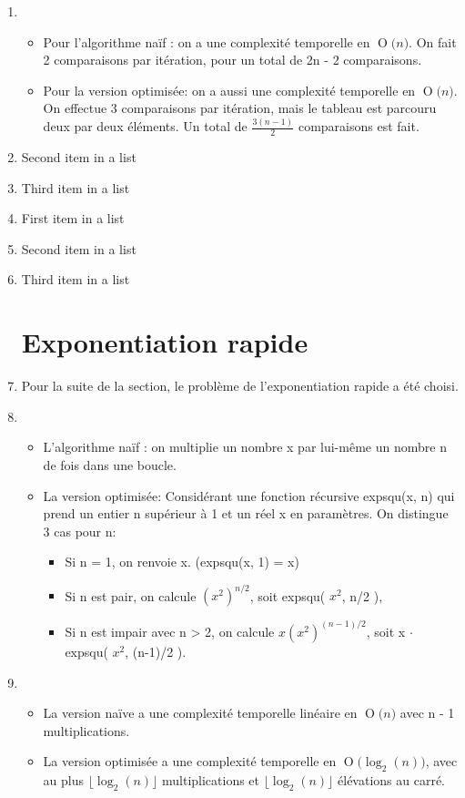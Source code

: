 \documentclass[paper=a4, fontsize=11pt]{scrartcl}
\numberwithin{equation}{section}		%
\numberwithin{figure}{section}			%
\numberwithin{table}{section}				%
\newcommand{\BigO}[1]{\ensuremath{\operatorname{O}\bigl(#1\bigr)}}
\begin{document}
\begin{enumerate}
   	\item
\begin{itemize}
    \item Pour l'algorithme naïf : on a une complexité temporelle en \BigO{n}. On fait 2 comparaisons par itération, pour un total
de 2n - 2 comparaisons.
    \item Pour la version optimisée: on a aussi une complexité temporelle en \BigO{n}. On effectue 3 comparaisons par itération, mais le tableau
est parcouru deux par deux éléments. Un total de \(\frac{3(n - 1)}{2}\) comparaisons est fait.
\end{itemize}

	\item Second item in a list
	\item Third item in a list
    \item First item in a list
	\item Second item in a list
	\item Third item in a list

\section{Exponentiation rapide}

	\item Pour la suite de la section, le problème de l'exponentiation rapide a été choisi.

   	\item

\begin{itemize}
    \item L'algorithme naïf : on multiplie un nombre x par lui-même un nombre n de fois dans une boucle.
    \item La version optimisée: Considérant une fonction récursive expsqu(x, n) qui prend un entier n supérieur à 1 et un réel
x en paramètres. On distingue 3 cas pour n:
\begin{itemize}[label=$\bullet$]
\item Si n = 1, on renvoie x. (expsqu(x, 1) = x)
\item Si n est pair, on calcule \( (x^2)^{n/2} \), soit expsqu( \(x^2\), n/2 ),
\item Si n est impair avec n > 2, on calcule \( x(x^2)^{(n-1)/2} \), soit x $\cdot$ expsqu( \( x^2 \), (n-1)/2 ).
\end{itemize}
\end{itemize}

	\item
\begin{itemize}
    \item La version naïve a une complexité temporelle linéaire en \BigO{n} avec n - 1 multiplications.
    \item
 La version optimisée a une complexité temporelle en \BigO{\log _2 \left( n \right )}, avec
    au plus $\lfloor \log _2 \left( n \right ) \rfloor$ multiplications et $\lfloor \log _2 \left( n \right ) \rfloor$ élévations au carré.
\end{itemize}


\end{enumerate}
\end{document}
